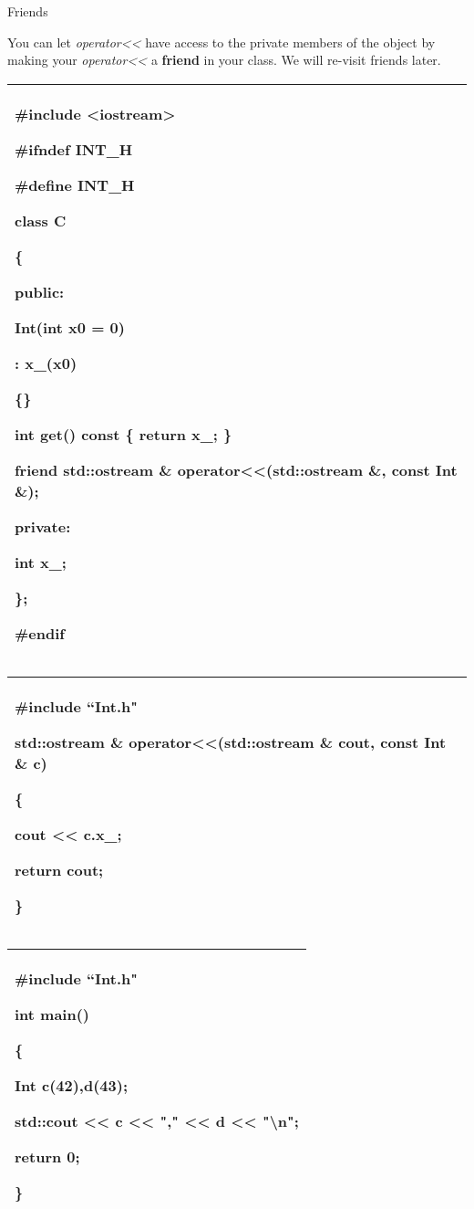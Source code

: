 \documentclass[
]{article}
\begin{document}
Friends

You can let \emph{operator\textless\textless{}} have access to the
private members of the object by making your
\emph{operator\textless\textless{}} a \textbf{friend} in your class. We
will re-visit friends later.

\begin{longtable}[]{@{}l@{}}
\toprule
\endhead
\begin{minipage}[t]{0.97\columnwidth}\raggedright
\#include \textless iostream\textgreater{}

\#ifndef INT\_H

\#define INT\_H

class C

\{

public:

Int(int x0 = 0)

: x\_(x0)

\{\}

int get() const \{ return x\_; \}

\textbf{friend} std::ostream \& operator\textless\textless(std::ostream
\&, const Int \&);

private:

int x\_;

\};

\#endif\strut
\end{minipage}\tabularnewline
\bottomrule
\end{longtable}

\begin{longtable}[]{@{}l@{}}
\toprule
\endhead
\begin{minipage}[t]{0.97\columnwidth}\raggedright
\#include ``Int.h"

std::ostream \& operator\textless\textless(std::ostream \& cout, const
Int \& c)

\{

cout \textless\textless{} \textbf{c.x\_};

return cout;

\}\strut
\end{minipage}\tabularnewline
\bottomrule
\end{longtable}

\begin{longtable}[]{@{}l@{}}
\toprule
\endhead
\begin{minipage}[t]{0.97\columnwidth}\raggedright
\#include ``Int.h"

int main()

\{

Int c(42),d(43);

std::cout \textless\textless{} c \textless\textless{} ","
\textless\textless{} d \textless\textless{} "\textbackslash n";

return 0;

\}\strut
\end{minipage}\tabularnewline
\bottomrule
\end{longtable}
\end{document}
